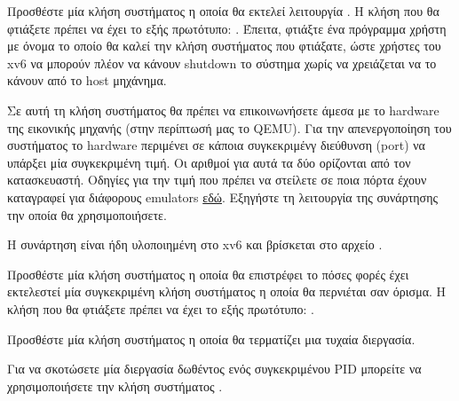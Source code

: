 \documentclass[18pt]{extarticle}
\begin{document}
\begin{question}
    Προσθέστε μία κλήση συστήματος η οποία θα εκτελεί λειτουργία . 
    Η κλήση που θα φτιάξετε πρέπει να έχει το εξής πρωτότυπο: .
    Έπειτα, φτιάξτε ένα πρόγραμμα χρήστη με όνομα  το οποίο θα καλεί την κλήση συστήματος που φτιάξατε, ώστε 
    χρήστες του xv6 να μπορούν πλέον να κάνουν shutdown το σύστημα χωρίς να χρειάζεται να το κάνουν από το host μηχάνημα.

    Σε αυτή τη κλήση συστήματος θα πρέπει να επικοινωνήσετε άμεσα με το hardware της εικονικής μηχανής (στην περίπτωσή μας το QEMU).
    Για την απενεργοποίηση του συστήματος το hardware περιμένει σε κάποια συγκεκριμένγ διεύθυνση (port) να υπάρξει μία συγκεκριμένη 
    τιμή. Οι αριθμοί για αυτά τα δύο ορίζονται από τον κατασκευαστή.
    Οδηγίες για την τιμή που πρέπει να στείλετε σε ποια πόρτα έχουν καταγραφεί για διάφορους emulators \href{https://wiki.osdev.org/Shutdown}{εδώ}.
    Εξηγήστε τη λειτουργία της συνάρτησης  την οποία θα χρησιμοποιήσετε.

    \begin{info}[Σημείωση:]
        Η συνάρτηση  είναι ήδη υλοποιημένη στο xv6 και βρίσκεται στο αρχείο .
    \end{info}
\end{question}

\begin{question}
    Προσθέστε μία κλήση συστήματος η οποία θα επιστρέφει το πόσες φορές έχει εκτελεστεί μία 
    συγκεκριμένη κλήση συστήματος η οποία θα περνιέται σαν όρισμα.
    Η κλήση που θα φτιάξετε πρέπει να έχει το εξής πρωτότυπο: .
\end{question}

\begin{question}
    Προσθέστε μία κλήση συστήματος η οποία θα τερματίζει μια τυχαία διεργασία.

    \begin{info}[Σημείωση:]
        Για να σκοτώσετε μία διεργασία δωθέντος ενός συγκεκριμένου PID
        μπορείτε να χρησιμοποιήσετε την κλήση συστήματος .
    \end{info}
\end{question}


\printbibliography
\end{document}
